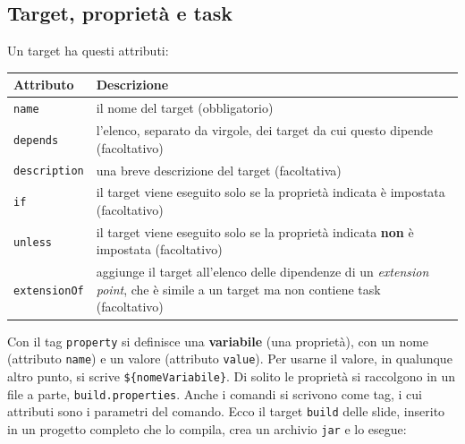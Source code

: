 \subsection{Target, proprietà e task}

Un target ha questi attributi:

\begin{center}
\renewcommand{\arraystretch}{1.2}
\begin{tabular}{lP{12.6cm}}
\toprule
\textbf{Attributo} & \textbf{Descrizione} \\
\midrule
\texttt{name} & il nome del target (obbligatorio) \\
\texttt{depends} & l'elenco, separato da virgole, dei target da cui questo dipende (facoltativo) \\
\texttt{description} & una breve descrizione del target (facoltativa) \\
\texttt{if} & il target viene eseguito solo se la proprietà indicata è impostata (facoltativo) \\
\texttt{unless} & il target viene eseguito solo se la proprietà indicata \textbf{non} è impostata (facoltativo) \\
\texttt{extensionOf} & aggiunge il target all'elenco delle dipendenze di un \textit{extension point}, che è simile a un
                       target ma non contiene task (facoltativo) \\
\bottomrule
\end{tabular}
\end{center}


Con il tag \texttt{property} si definisce una \textbf{variabile} (una proprietà), con un nome (attributo \texttt{name}) e
un valore (attributo \texttt{value}). Per usarne il valore, in qualunque altro punto, si scrive
\texttt{\$\{nomeVariabile\}}. Di solito le proprietà si raccolgono in un file a parte, \texttt{build.properties}. Anche i
comandi si scrivono come tag, i cui attributi sono i parametri del comando. Ecco il target \texttt{build} delle slide,
inserito in un progetto completo che lo compila, crea un archivio \texttt{jar} e lo esegue:

